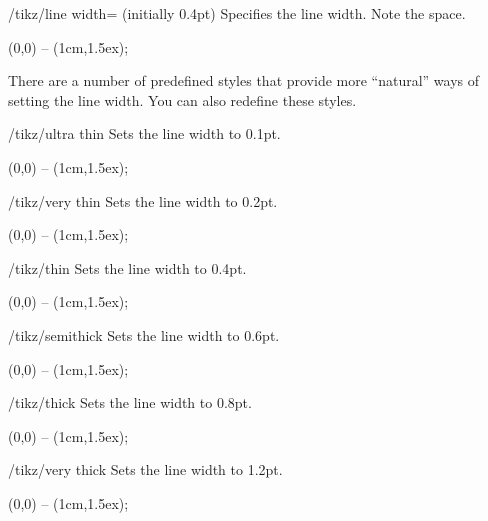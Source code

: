 \label{section-cap-joins}

\begin{key}{/tikz/line width= (initially 0.4pt)}
  Specifies the line width. Note the space.

\begin{codeexample}[]
  \tikz \draw[line width=5pt] (0,0) -- (1cm,1.5ex);
\end{codeexample}
\end{key}

There are a number of predefined styles that provide more ``natural''
ways of setting the line width. You can also redefine these
styles. 

\begin{stylekey}{/tikz/ultra thin}
  Sets the line width to 0.1pt.
\begin{codeexample}[]
  \tikz {} (0,0) -- (1cm,1.5ex);
\end{codeexample}
\end{stylekey}

\begin{stylekey}{/tikz/very thin}
  Sets the line width to 0.2pt.
\begin{codeexample}[]
  \tikz {} (0,0) -- (1cm,1.5ex);
\end{codeexample}
\end{stylekey}

\begin{stylekey}{/tikz/thin}
  Sets the line width to 0.4pt.
\begin{codeexample}[]
  \tikz \draw[thin] (0,0) -- (1cm,1.5ex);
\end{codeexample}
\end{stylekey}

\begin{stylekey}{/tikz/semithick}
  Sets the line width to 0.6pt.
\begin{codeexample}[]
  \tikz \draw[semithick] (0,0) -- (1cm,1.5ex);
\end{codeexample}
\end{stylekey}

\begin{stylekey}{/tikz/thick}
  Sets the line width to 0.8pt.
\begin{codeexample}[]
  \tikz \draw[thick] (0,0) -- (1cm,1.5ex);
\end{codeexample}
\end{stylekey}

\begin{stylekey}{/tikz/very thick}
  Sets the line width to 1.2pt.
\begin{codeexample}[]
  \tikz {} (0,0) -- (1cm,1.5ex);
\end{codeexample}
\end{stylekey}

